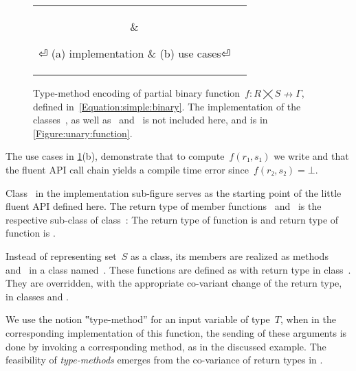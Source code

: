 \begin{figure}[hbt]
  \caption{\label{Figure:simple:binary}%
  Type-method encoding of partial binary function~$f: R⨉S↛Γ$,
  defined in~\cref{Equation:simple:binary}. The implementation of the classes~, 
  as well as~ and~ is not included here, and is
  in \cref{Figure:unary:function}.}

  \begin{tabular}{cc}
   \hspace{-2.5ex}
   \parbox[c]{0.57\linewidth}{%
   }
   &
   \hspace{-2.5ex}
   \parbox[c]{0.48\linewidth}{%
   }
⏎
   \hspace{-7ex}(a) implementation & \hspace{-5ex}(b) use cases⏎
  \end{tabular}
\end{figure}

The use cases in \cref{Figure:simple:binary}(b), demonstrate
  that to compute~$f(r₁,s₁)$ we write 
  and that the fluent API call chain  yields
  a compile time error since~$f(r₂, s₂)=⊥$.

Class~ in the implementation sub-figure serves as
  the starting point of the little fluent API defined here.
The return type of  member functions~ and~
  is the respective sub-class of class~:
The return type of function  is   
  and return type of function  is  . 

Instead of representing set~$S$ as a class,
  its members are realized as methods~ and~ in a class
  named~.
These functions are defined as  with return type 
  in class~.
They are overridden, with the appropriate co-variant change of the return type,
  in classes  and .

We use the notion ‟type-method” for an input variable of type~$T$, when in the
  corresponding implementation of this function, the sending of these arguments is done
  by invoking a corresponding method, as in the discussed example.
The feasibility of \emph{type-methods} emerges from the co-variance of return types in
  \Java.

